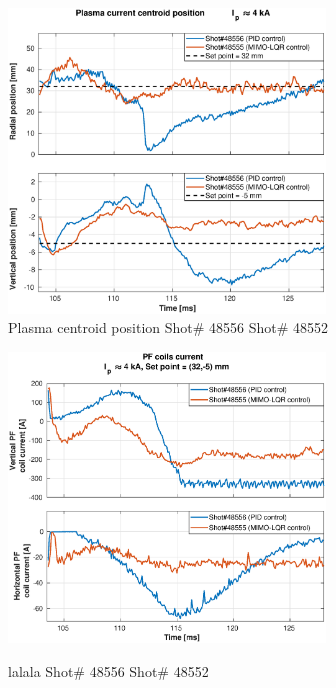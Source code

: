 \begin{figure}
	\centering
	\includegraphics[width=0.75\textwidth]{Chp5/PIDvsMIMO_556_555_2.eps}
	\caption{Plasma centroid position  Shot\# 48556 Shot\# 48552}
\end{figure}

\begin{figure}
	\centering
	\includegraphics[width=0.75\textwidth]{Chp5/PIDvsMIMO_556_555_curr_2.eps}
	\label{564_559curr}
	\caption{lalala  Shot\# 48556 Shot\# 48552}
\end{figure}

